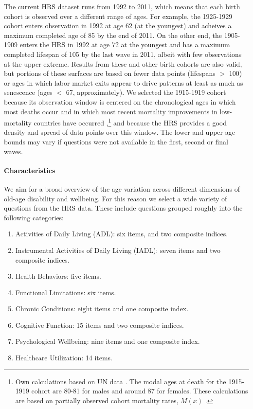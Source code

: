 \documentclass[11pt,oneside]{article} %
\begin{document}
The current HRS dataset runs from 1992 to 2011, which
means that each birth cohort is observed over a different range of ages. For
example, the 1925-1929 cohort enters observation in 1992 at age 62 (at the
youngest) and acheives a maximum completed age of 85 by the end of 2011. On the
other end, the 1905-1909 enters the HRS in 1992 at age 72 at the youngest and
has a maximum completed lifespan of 105 by the last wave in 2011, albeit with
few observations at the upper extreme. Results from these and other birth cohorts are also
valid, but portions of these surfaces are based on fewer data points (lifespans $>$ 100) or ages in which labor market
exits appear to drive patterns at least as much as senescence (ages $<$ 67,
approximately). We selected the 1915-1919 cohort because
its observation window is centered on the chronological ages in which most
deaths occur and in which most recent mortality improvements in
low-mortality countries have occurred ,\footnote{Own calculations based on UN
data \citep{UN2012prospects}. The modal ages at death for the 1915-1919 cohort
are 80-81 for males and around 87 for females. These calculations are based on
partially observed cohort mortality rates, $M(x)$ \citep{HMD}.} and because the
HRS provides a good density and spread of data points over this window. The lower and upper age bounds may vary if questions were not available in the first, second or final waves.

\paragraph*{Characteristics}
We aim for a broad overview of the age variation across different dimensions of
old-age disability and wellbeing. For this reason we select a wide variety of
questions from the HRS data. These include questions
grouped roughly into the following categories: 

\begin{enumerate}
  \item Activities of Daily Living (ADL): six items, and two composite indices.
  \item Instrumental Activities of Daily Living (IADL): seven items and two
  composite indices.
  \item Health Behaviors: five items.
  \item Functional Limitations: six items.
  \item Chronic Conditions: eight items and one composite index.
  \item Cognitive Function: 15 items and two composite indices.
  \item Psychological Wellbeing: nine items and one composite index.
  \item Healthcare Utilization: 14 items.
\end{enumerate}
\end{document}
